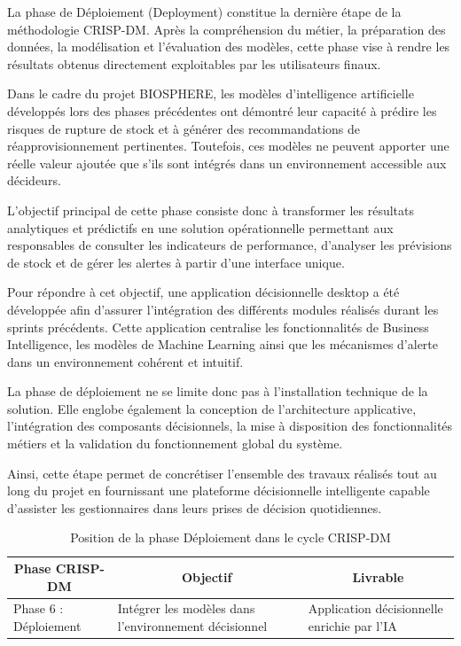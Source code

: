 La phase de Déploiement (Deployment) constitue la dernière étape de la méthodologie CRISP-DM. Après la compréhension du métier, la préparation des données, la modélisation et l'évaluation des modèles, cette phase vise à rendre les résultats obtenus directement exploitables par les utilisateurs finaux.

Dans le cadre du projet BIOSPHERE, les modèles d'intelligence artificielle développés lors des phases précédentes ont démontré leur capacité à prédire les risques de rupture de stock et à générer des recommandations de réapprovisionnement pertinentes. Toutefois, ces modèles ne peuvent apporter une réelle valeur ajoutée que s'ils sont intégrés dans un environnement accessible aux décideurs.

L'objectif principal de cette phase consiste donc à transformer les résultats analytiques et prédictifs en une solution opérationnelle permettant aux responsables de consulter les indicateurs de performance, d'analyser les prévisions de stock et de gérer les alertes à partir d'une interface unique.

Pour répondre à cet objectif, une application décisionnelle desktop a été développée afin d'assurer l'intégration des différents modules réalisés durant les sprints précédents. Cette application centralise les fonctionnalités de Business Intelligence, les modèles de Machine Learning ainsi que les mécanismes d'alerte dans un environnement cohérent et intuitif.

La phase de déploiement ne se limite donc pas à l'installation technique de la solution. Elle englobe également la conception de l'architecture applicative, l'intégration des composants décisionnels, la mise à disposition des fonctionnalités métiers et la validation du fonctionnement global du système.

Ainsi, cette étape permet de concrétiser l'ensemble des travaux réalisés tout au long du projet en fournissant une plateforme décisionnelle intelligente capable d'assister les gestionnaires dans leurs prises de décision quotidiennes.

\begin{table}[H]
\centering
\caption{Position de la phase Déploiement dans le cycle CRISP-DM}
\label{tab:ch5:deployment_crisp}
\small
\begin{tabular}{|p{4cm}|p{5.5cm}|p{5.5cm}|}
\hline
\multicolumn{1}{|c|}{\textbf{Phase CRISP-DM}} & 
\multicolumn{1}{c|}{\textbf{Objectif}} & 
\multicolumn{1}{c|}{\textbf{Livrable}} \\
\hline
Phase 6 : Déploiement & Intégrer les modèles dans l'environnement décisionnel & Application décisionnelle enrichie par l'IA \\
\hline
\end{tabular}
\end{table}

